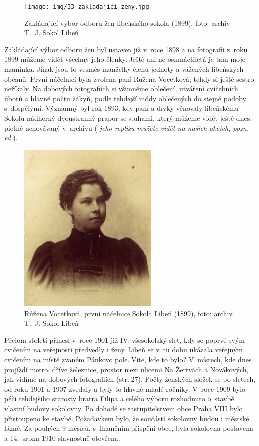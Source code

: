 \documentclass[a5paper, 11pt, twoside]{article}
\newcommand{\pozned}[1]{%
\textit{#1}}
\begin{document}
\begin{figure}[h!]
  \centering 
  \texttt{[image: img/33\_zakladajici\_zeny.jpg]}
  \caption*{Zakládající výbor odboru žen libeňského sokola (1899), foto:
  archiv T.~J. Sokol Libeň}
\end{figure}

Zakládající výbor odboru žen byl ustaven již v~roce 1898 a na fotografii
z~roku 1899 můžeme vidět všechny jeho členky. Ještě ani ne osmnáctiletá
je tam moje maminka. Jinak jsou to vesměs manželky členů jednoty a
vážených libeňských občanů. První náčelnicí byla zvolena paní Růžena
Vocetková, tehdy si ještě sestro neříkaly. Na dobových fotografiích si
všimněme oblečení, utváření cvičebních úborů a hlavně počtu žákyň, podle
tehdejší módy oblečených do stejné podoby s~dospělými. Významný byl rok
1893, kdy paní a dívky věnovaly libeňskému Sokolu nádherný dvoustranný
prapor se stuhami, který můžeme vidět ještě dnes, pietně uchovávaný
v~archivu (\pozned{jeho repliku můžete vidět na našich akcích, pozn. ed.}).

\begin{figure}[h!]
  \centering 
  \includegraphics[width=0.6\textwidth]{img/34_vocetkova_nacelnice.jpg}
  \caption*{Růžena Vocetková, první náčelnice Sokola Libeň (1899), foto:
  archiv T.~J. Sokol Libeň}
\end{figure}

Přelom století přinesl v~roce 1901 již IV. všesokolský slet, kdy se
poprvé svým cvičením na veřejnosti předvedly i ženy. Libeň se v~tu dobu
ukázala veřejným cvičením na místě zvaném Pánkovo pole. Víte, kde to
bylo? V~místech, kde dnes projíždí metro, dříve železnice, prostor mezi
ulicemi Na Žertvách a Novákových, jak vidíme na dobových fotografiích (str. 27). %
Počty ženských složek se po sletech, od roku 1901 a 1907 zvedaly a byly
to hlavně mladé ročníky. V~roce 1909 bylo péčí tehdejšího starosty
bratra Filipa a celého výboru rozhodnuto o~stavbě vlastní budovy
sokolovny. Po dohodě se zastupitelstvem obce Praha VIII bylo přistoupeno
ke stavbě. Požadavkem bylo, že součástí sokolovny budou i městské lázně.
Za pouhých 9 měsíců, s~finančním přispění obce, byla sokolovna postavena
a 14.~srpna 1910 slavnostně otevřena.
\end{document}
